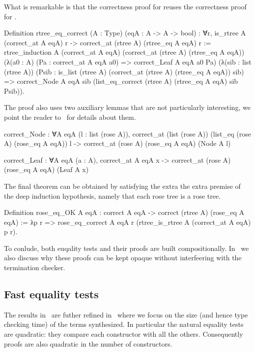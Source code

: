 \documentclass[a4paper, 11pt]{book}
\begin{document}
What is remarkable is that the correctness proof for 
reuses the correctness proof for .

\begin{rocqcode}
Definition rtree_eq_correct (A : Type) (eqA : A -> A -> bool) :
  ∀r, is_rtree A (correct_at A eqA) r ->
        correct_at (rtree A) (rtree_eq A eqA) r
:=
  rtree_induction
    A (correct_at A eqA) (correct_at (rtree A) (rtree_eq A eqA))
    (λ(a0 : A) (Pa : correct_at A eqA a0) =>
       correct_Leaf A eqA a0 Pa)
    (λ(sib : list (rtree A))
         (Psib : is_list (rtree A)
                   (correct_at (rtree A) (rtree_eq A eqA)) sib) =>
       correct_Node A eqA sib
         (list_eq_correct (rtree A) (rtree_eq A eqA) sib Psib)).
\end{rocqcode}

The proof also uses two auxiliary lemmas that are not particularly interesting,
we point the reader to~\cite{tassi:hal-01897468} for details about them.

\begin{rocqcode}
correct_Node : ∀A eqA (l : list (rose A)),
  correct_at (list (rose A)) (list_eq (rose A) (rose_eq A eqA)) l ->
    correct_at (rose A) (rose_eq A eqA) (Node A l)

correct_Leaf : ∀A eqA (a : A),
  correct_at A eqA x ->
    correct_at (rose A) (rose_eq A eqA) (Leaf A x)
  \end{rocqcode}
  
The final theorem can be obtained by satisfying the extra the extra
premise of the deep induction hypothesis, namely that each rose tree
is a rose tree.

\begin{rocqcode}
Definition rose_eq_OK A eqA :
  correct A eqA -> correct (rtree A) (rose_eq A eqA)
:=
  λp r =>
    rose_eq_correct A eqA
      r (rtree_is_rtree A (correct_at A eqA) p r).
\end{rocqcode}

To conlude, both euqality tests and their proofs are built compositionally.
In~\cite{tassi:hal-01897468} we also discuss why these proofs can be kept opaque
without interfeering with the termination checker.

\subsection{Fast equality tests}

The results in~\cite{tassi:hal-01897468} are futher refined in~\cite{gregoire:hal-03800154}
where we focus on the size (and hence type checking time) of the terms
synthesized. In particular the natural equality tests are quadratic: they
compare each constructor with all the others. Consequently proofs are also
quadratic in the number of constructors.
\end{document}
